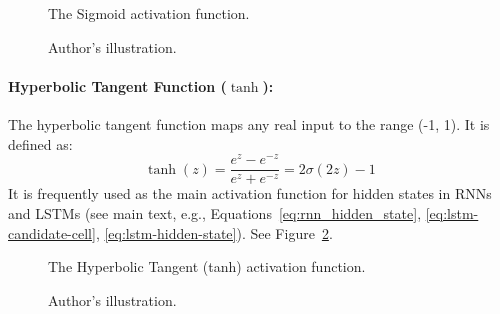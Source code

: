 \begin{appendices}
  \begin{figure}[htbp] %
    \centering
    \caption[Sigmoid Activation Function]{The Sigmoid activation function.}
    \label{fig:sigmoid_plot} %
    \caption*{Author's illustration.}
  \end{figure}


  \paragraph{Hyperbolic Tangent Function (\( \tanh \)):}
  The hyperbolic tangent function maps any real input to the range (-1, 1). It is defined as:
  \begin{equation}
    \tanh(z) = \frac{e^z - e^{-z}}{e^z + e^{-z}} = 2\sigma(2z) - 1 %
  \end{equation}
  It is frequently used as the main activation function for hidden states in RNNs and LSTMs (see main text, e.g., Equations~\ref{eq:rnn_hidden_state}, \ref{eq:lstm-candidate-cell}, \ref{eq:lstm-hidden-state}). See Figure~\ref{fig:tanh_plot}.

  \begin{figure}[htbp]
    \centering
    \caption[Tanh activation function]{The Hyperbolic Tangent (tanh) activation function.}
    \label{fig:tanh_plot} %
    \caption*{Author's illustration.}
  \end{figure}



\end{appendices}
